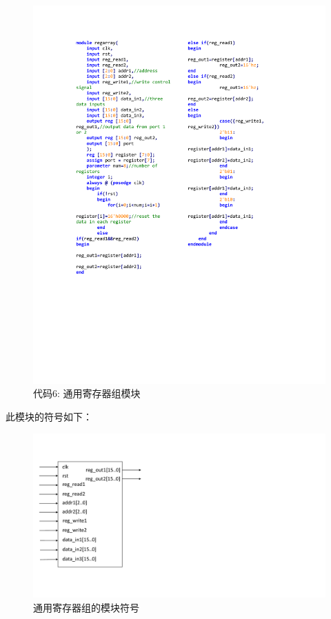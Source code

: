 \documentclass[titlepage, 11pt]{article}
\begin{document}
		\begin{figure}[H]
			\centering
			\includegraphics[scale=0.961]{24.pdf}
			\caption*{代码6: 通用寄存器组模块}
		\end{figure}
		此模块的符号如下：
		\begin{figure}[H]
			\centering
			\includegraphics[scale=0.5]{25.pdf}
			\caption{通用寄存器组的模块符号}
		\end{figure}
\end{document}
